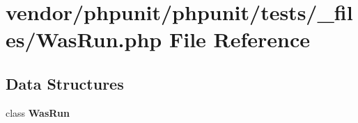 \section{vendor/phpunit/phpunit/tests/\+\_\+files/\+Was\+Run.php File Reference}
\label{_was_run_8php}
\subsection*{Data Structures}
\begin{DoxyCompactItemize}
\item 
class {\bf Was\+Run}
\end{DoxyCompactItemize}
